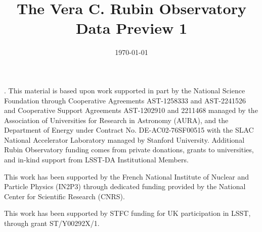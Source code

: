\documentclass[ linenumbers, twocolappendix,trackchanges]{aastex7}
\begin{document}
\date{\today}
\title{The Vera C. Rubin Observatory Data Preview 1}
















\begin{acknowledgments}.
This material is based upon work supported in part by the National Science Foundation through Cooperative Agreements AST-1258333 and AST-2241526 and Cooperative Support Agreements AST-1202910 and 2211468 managed by the Association of Universities for Research in Astronomy (AURA), and the Department of Energy under Contract No. DE-AC02-76SF00515 with the SLAC National Accelerator Laboratory managed by Stanford University. 
Additional Rubin Observatory funding comes from private donations, grants to universities, and in-kind support from LSST-DA Institutional Members.

This work has been supported by the French National Institute of Nuclear and Particle Physics (IN2P3) through dedicated funding provided by the National Center for Scientific Research (CNRS).

This work has been supported by STFC funding for UK participation in LSST, through grant ST/Y00292X/1.
\end{acknowledgments}
\vspace{5mm}



\appendix
\printglossaries



\end{document}
